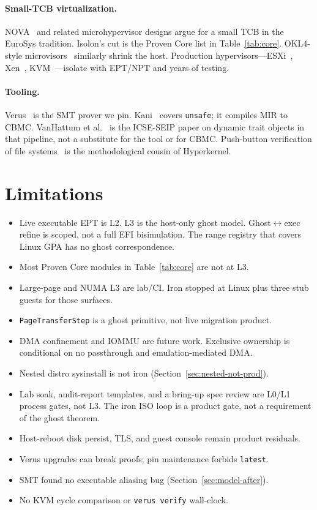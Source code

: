 \documentclass[sigplan,10pt,anonymous]{acmart}
\begin{document}
\paragraph{Small-TCB virtualization.}
NOVA~\cite{steinberg2010nova} and related microhypervisor designs argue for a
small TCB in the EuroSys tradition. Isolon's cut is the Proven Core list in
Table~\ref{tab:core}. OKL4-style microvisors~\cite{heiser2010sel4okl4}
similarly shrink the host. Production
hypervisors---ESXi~\cite{bugnion2012workstation}, Xen~\cite{barham2003xen},
KVM~\cite{kivity2007kvm}---isolate with EPT/NPT and years of testing.

\paragraph{Tooling.}
Verus~\cite{lattuada2023verus,lattuada2024verus} is the SMT prover we pin.
Kani~\cite{delmas2026kani,kroening2014cbmc} covers \texttt{unsafe}; it
compiles MIR to CBMC. VanHattum et al.~\cite{vanhattum2022kani} is the
ICSE-SEIP paper on dynamic trait objects in that pipeline, not a
substitute for the tool or for CBMC. Push-button verification of file
systems~\cite{sigurbjarnarson2016pushbutton} is the methodological cousin of
Hyperkernel.

\section{Limitations}

\begin{itemize}
\item Live executable EPT is L2. L3 is the host-only ghost model.
  Ghost$\leftrightarrow$exec refine is scoped, not a full EFI bisimulation.
  The range registry that covers Linux GPA has no ghost correspondence.
\item Most Proven Core modules in Table~\ref{tab:core} are not at L3.
\item Large-page and NUMA L3 are lab/CI. Iron stopped at Linux plus three
  stub guests for those surfaces.
\item \texttt{PageTransferStep} is a ghost primitive, not live migration
  product.
\item DMA confinement and IOMMU are future work. Exclusive ownership is
  conditional on no passthrough and emulation-mediated DMA.
\item Nested distro sysinstall is not iron
  (Section~\ref{sec:nested-not-prod}).
\item Lab soak, audit-report templates, and a bring-up spec review are
  L0/L1 process gates, not L3. The iron ISO loop is a product gate, not a
  requirement of the ghost theorem.
\item Host-reboot disk persist, TLS, and guest console remain product
  residuals.
\item Verus upgrades can break proofs; pin maintenance forbids
  \texttt{latest}.
\item SMT found no executable aliasing bug (Section~\ref{sec:model-after}).
\item No KVM cycle comparison or \texttt{verus verify} wall-clock.
\end{itemize}
\end{document}
